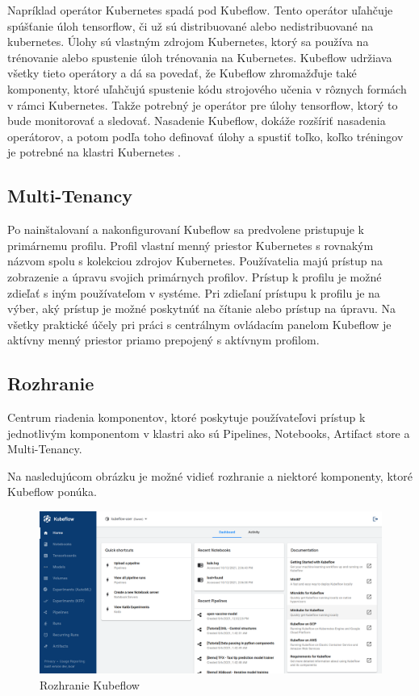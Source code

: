 Napríklad operátor Kubernetes spadá pod Kubeflow. Tento operátor uľahčuje spúšťanie úloh tensorflow, či už sú distribuované alebo nedistribuované na kubernetes. Úlohy sú vlastným zdrojom Kubernetes, ktorý sa používa na trénovanie alebo spustenie úloh trénovania na Kubernetes. Kubeflow udržiava všetky tieto operátory a dá sa povedať, že Kubeflow zhromažďuje také komponenty, ktoré uľahčujú spustenie kódu strojového učenia v rôznych formách v rámci Kubernetes. Takže potrebný je operátor pre úlohy tensorflow, ktorý to bude monitorovať a sledovať. Nasadenie Kubeflow, dokáže rozšíriť nasadenia operátorov, a potom podľa toho definovať úlohy a spustiť toľko, koľko tréningov je potrebné na klastri Kubernetes \cite{operator}.

\subsection*{Multi-Tenancy}

Po nainštalovaní a nakonfigurovaní Kubeflow sa predvolene pristupuje k primárnemu profilu. Profil vlastní menný priestor Kubernetes s rovnakým názvom spolu s kolekciou zdrojov Kubernetes. Používatelia majú prístup na zobrazenie a úpravu svojich primárnych profilov. Prístup k profilu je možné zdieľať s iným používateľom v systéme. Pri zdieľaní prístupu k profilu je na výber, aký prístup je možné poskytnúť na čítanie alebo prístup na úpravu. Na všetky praktické účely pri práci s centrálnym ovládacím panelom Kubeflow je aktívny menný priestor priamo prepojený s aktívnym profilom.

\subsection*{Rozhranie}

Centrum riadenia komponentov, ktoré poskytuje používateľovi prístup k jednotlivým komponentom v klastri ako sú Pipelines, Notebooks, Artifact store a Multi-Tenancy.

Na nasledujúcom obrázku je možné vidieť rozhranie a niektoré komponenty, ktoré Kubeflow ponúka.

\clearpage

\begin{figure}[!h]
    \centering
    \includegraphics[width=1\linewidth]{figures/Rozhranie}
    \caption{Rozhranie Kubeflow}
\end{figure}

